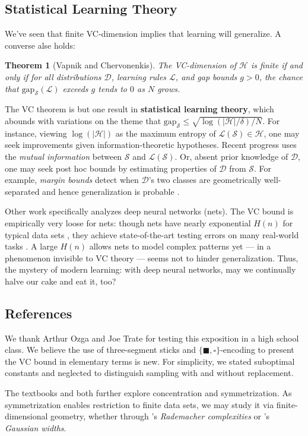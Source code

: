 \documentclass[twocolumn, 11pt]{article}
\newcommand{\Dd}{\mathcal{D}}
\newcommand{\Hh}{\mathcal{H}}
\newcommand{\Ll}{\mathcal{L}}
\newcommand{\Ss}{\mathcal{S}}
\newcommand{\Egap} {\text{gap}_{\Ss}}
\newtheorem*{thm}{Theorem}
\theoremstyle{definition}
\newcommand{\msec}[1]{\subsection*{\color{mblu}\textsf{#1}}}
\begin{document}
    \msec{Statistical Learning Theory}

        We've seen that finite VC-dimension implies that learning will
        generalize.  A converse alse holds:
        \begin{thm}[Vapnik and Chervonenkis]
            The VC-dimension of $\Hh$ is finite if and only if for all
            distributions $\Dd$, learning rules $\Ll$, and gap bounds $g>0$, the
            chance that $\Egap(\Ll)$ exceeds $g$ tends to $0$ as
            $N$ grows.  
        \end{thm}

        The VC theorem is but one result in \textbf{statistical learning
        theory}, which abounds with variations on the theme that $\Egap \leq
        \sqrt{\log(|\Hh|/\delta)/N}$.
        For instance, viewing $\log(|\Hh|)$ as the maximum entropy of $\Ll(\Ss)
        \in \Hh$, one may seek improvements given information-theoretic
        hypotheses.  Recent progress \cite{abbe} uses the \emph{mutual
        information} between $\Ss$ and $\Ll(\Ss)$.
        Or, absent prior knowledge of $\Dd$, one may seek post hoc bounds by
        estimating properties of $\Dd$ from $\Ss$.  For example, \emph{margin
        bounds} detect when $\Dd$'s two classes are geometrically
        well-separated and hence generalization is probable \cite{mohri}.

        Other work specifically analyzes deep neural networks (nets).  The VC
        bound is empirically very loose for nets: though nets have nearly
        exponential $H(n)$ for typical data sets \cite{bengio}, they achieve
        state-of-the-art testing errors on many real-world tasks \cite{hinton}.
        A large $H(n)$ allows nets to model complex patterns yet --- in a
        phenomenon invisible to VC theory --- seems not to hinder
        generalization.
        Thus, the mystery of modern learning: with deep neural networks, may we
        continually halve our cake and eat it, too?

    \msec{References}
        We thank Arthur Ozga and Joe Trate for testing
        this exposition in a high school class.
        We believe the use of three-segment sticks and $\{\blacksquare,
        \square\}$-encoding to present the VC bound in elementary terms is new.
        For simplicity, we stated suboptimal constants and neglected to
        distinguish sampling with and without replacement.

        The textbooks \cite{mohri} and \cite{roman} both further explore
        concentration and symmetrization.  As symmetrization enables
        restriction to finite data sets, we may study it via
        finite-dimensional geometry, whether through \cite{mohri}'s
        \emph{Rademacher complexities} or \cite{roman}'s \emph{Gaussian
        widths}.
\end{document}
